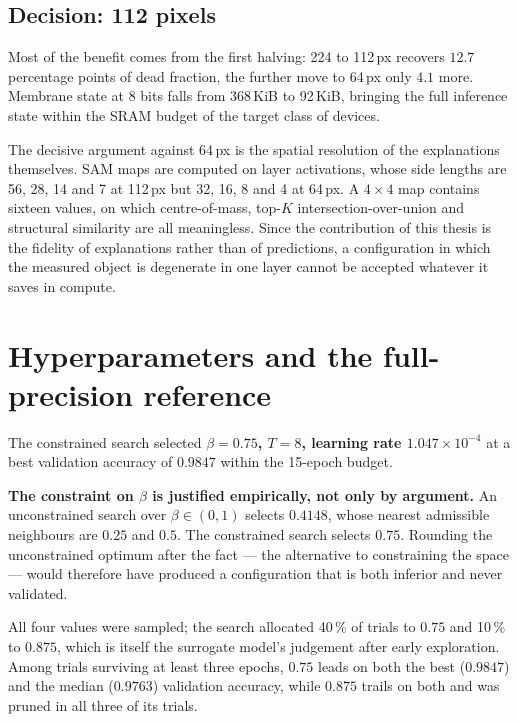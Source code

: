 \subsection{Decision: 112 pixels}

Most of the benefit comes from the first halving: 224 to 112\,px recovers $12.7$
percentage points of dead fraction, the further move to 64\,px only $4.1$ more.
Membrane state at 8 bits falls from 368\,KiB to 92\,KiB, bringing the full
inference state within the SRAM budget of the target class of devices.

The decisive argument against 64\,px is the spatial resolution of the
explanations themselves. SAM maps are computed on layer activations, whose side
lengths are 56, 28, 14 and 7 at 112\,px but 32, 16, 8 and 4 at 64\,px. A
$4 \times 4$ map contains sixteen values, on which centre-of-mass, top-$K$
intersection-over-union and structural similarity are all meaningless. Since the
contribution of this thesis is the fidelity of explanations rather than of
predictions, a configuration in which the measured object is degenerate in one
layer cannot be accepted whatever it saves in compute.

\section{Hyperparameters and the full-precision reference}
\label{sec:hyperparameters}

The constrained search selected \textbf{$\beta = 0.75$, $T = 8$, learning rate
$1.047 \times 10^{-4}$} at a best validation accuracy of $0.9847$ within the
15-epoch budget.

\textbf{The constraint on $\beta$ is justified empirically, not only by
argument.} An unconstrained search over $\beta \in (0,1)$ selects $0.4148$, whose
nearest admissible neighbours are $0.25$ and $0.5$. The constrained search
selects $0.75$. Rounding the unconstrained optimum after the fact --- the
alternative to constraining the space --- would therefore have produced a
configuration that is both inferior and never validated.

All four values were sampled; the search allocated 40\,\% of trials to $0.75$ and
10\,\% to $0.875$, which is itself the surrogate model's judgement after early
exploration. Among trials surviving at least three epochs, $0.75$ leads on both
the best ($0.9847$) and the median ($0.9763$) validation accuracy, while $0.875$
trails on both and was pruned in all three of its trials.

